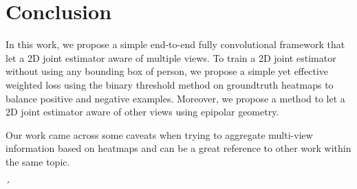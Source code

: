 
\chapter{Conclusion}\label{chapter:introduction}
In this work, we propose a simple end-to-end fully convolutional framework that let a 2D joint estimator aware of multiple views. To train a 2D joint estimator without using any bounding box of person, we propose a simple yet effective weighted loss using the binary threshold method on groundtruth heatmaps to balance positive and negative examples. Moreover, we propose a method to let a 2D joint estimator aware of other views using epipolar geometry.

Our work came across some caveats when trying to aggregate multi-view information based on heatmaps and can be a great reference to other work within the same topic.

´